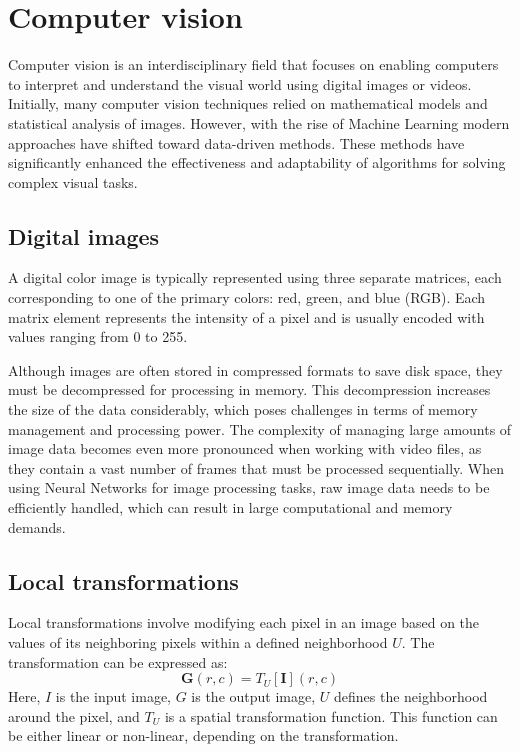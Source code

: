 \section{Computer vision}

Computer vision is an interdisciplinary field that focuses on enabling computers to interpret and understand the visual world using digital images or videos. 
Initially, many computer vision techniques relied on mathematical models and statistical analysis of images. 
However, with the rise of Machine Learning modern approaches have shifted toward data-driven methods. 
These methods have significantly enhanced the effectiveness and adaptability of algorithms for solving complex visual tasks.

\subsection{Digital images}
A digital color image is typically represented using three separate matrices, each corresponding to one of the primary colors: red, green, and blue (RGB). 
Each matrix element represents the intensity of a pixel and is usually encoded with values ranging from 0 to 255.

Although images are often stored in compressed formats to save disk space, they must be decompressed for processing in memory. 
This decompression increases the size of the data considerably, which poses challenges in terms of memory management and processing power. 
The complexity of managing large amounts of image data becomes even more pronounced when working with video files, as they contain a vast number of frames that must be processed sequentially.
When using Neural Networks for image processing tasks, raw image data needs to be efficiently handled, which can result in large computational and memory demands.

\subsection{Local transformations}
Local transformations involve modifying each pixel in an image based on the values of its neighboring pixels within a defined neighborhood $U$. 
The transformation can be expressed as:
\[\mathbf{G}(r,c)=T_U[\mathbf{I}](r,c)\]
Here, $I$ is the input image, $G$ is the output image, $U$ defines the neighborhood around the pixel, and $T_U$ is a spatial transformation function. 
This function can be either linear or non-linear, depending on the transformation.


